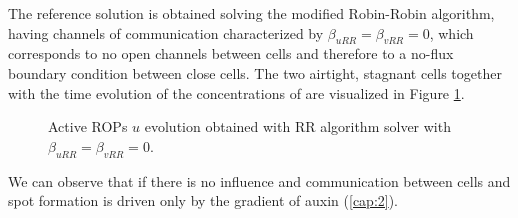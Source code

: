 The reference solution is obtained solving the modified Robin-Robin algorithm, having channels of communication characterized by $\beta_{uRR} = \beta_{vRR} = 0 $, which corresponds to no open channels between cells and therefore to a no-flux boundary condition between close cells. The two airtight, stagnant cells together with the time evolution of the concentrations of are visualized in Figure \ref{fig:beta0}.
\begin{figure}[H]
    \centering
    \quad
    \quad
    \quad
    \quad
    \quad
    \quad
    \caption[2cell RR modified Active ROPs - $\beta_{uRR} = \beta_{vRR} = 0 $]{Active ROPs $u$ evolution obtained with RR algorithm solver with $\beta_{uRR} = \beta_{vRR} = 0 $.}
    \label{fig:beta0}
\end{figure}

We can observe that if there is no influence and communication between cells and spot formation is driven only by the gradient of auxin (\ref{cap:2}).

